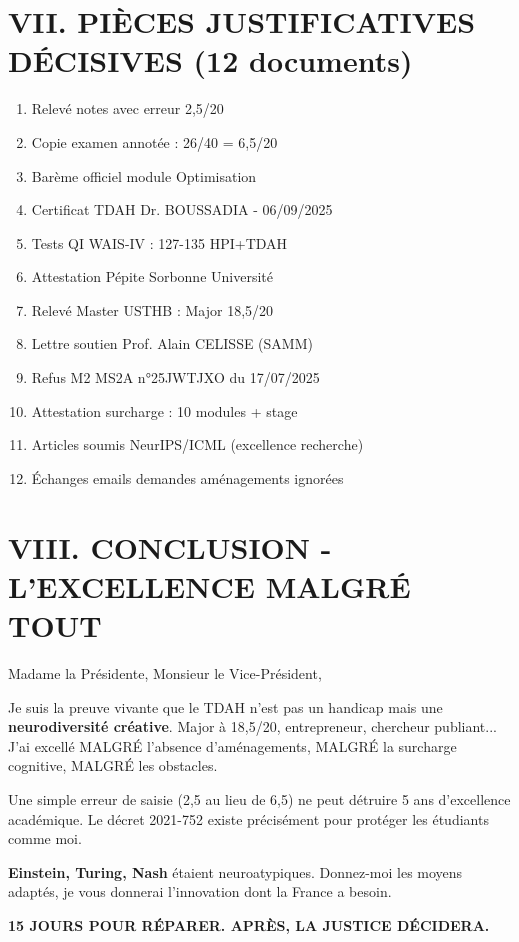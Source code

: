 \documentclass[12pt,french]{scrlttr2}
\begin{document}
\begin{letter}
\section*{VII. PIÈCES JUSTIFICATIVES DÉCISIVES (12 documents)}

\begin{enumerate}
\item \colorbox{red!20}{Relevé notes avec erreur 2,5/20}
\item \colorbox{green!20}{Copie examen annotée : 26/40 = 6,5/20}
\item Barème officiel module Optimisation
\item \colorbox{yellow!20}{Certificat TDAH} Dr. BOUSSADIA - 06/09/2025
\item \colorbox{yellow!20}{Tests QI WAIS-IV} : 127-135 HPI+TDAH
\item Attestation Pépite Sorbonne Université
\item Relevé Master USTHB : Major 18,5/20
\item Lettre soutien Prof. Alain CELISSE (SAMM)
\item Refus M2 MS2A n°25JWTJXO du 17/07/2025
\item Attestation surcharge : 10 modules + stage
\item Articles soumis NeurIPS/ICML (excellence recherche)
\item Échanges emails demandes aménagements ignorées
\end{enumerate}

\section*{VIII. CONCLUSION - L'EXCELLENCE MALGRÉ TOUT}

Madame la Présidente, Monsieur le Vice-Président,

Je suis la preuve vivante que le TDAH n'est pas un handicap mais une \textbf{neurodiversité créative}. Major à 18,5/20, entrepreneur, chercheur publiant... J'ai excellé MALGRÉ l'absence d'aménagements, MALGRÉ la surcharge cognitive, MALGRÉ les obstacles.

Une simple erreur de saisie (2,5 au lieu de 6,5) ne peut détruire 5 ans d'excellence académique. Le décret 2021-752 existe précisément pour protéger les étudiants comme moi.

\textbf{Einstein, Turing, Nash} étaient neuroatypiques. Donnez-moi les moyens adaptés, je vous donnerai l'innovation dont la France a besoin.

\colorbox{green!20}{\parbox{0.95\textwidth}{
\centering
\Large \textbf{15 JOURS POUR RÉPARER. APRÈS, LA JUSTICE DÉCIDERA.}
}}


\end{letter}
\end{document}
